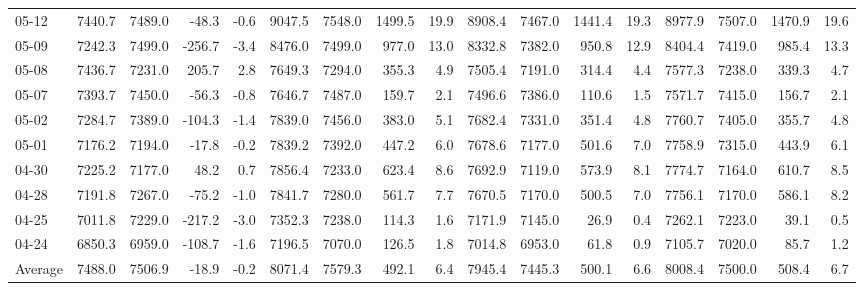 \begin{threeparttable}
{\begin{tabular}{lrrrrrrrrrrrrrrrr}
  05-12 & 7440.7 & 7489.0 &      -48.3 &           -0.6 &  9047.5 & 7548.0 &     1499.5 &           19.9 & 8908.4 & 7467.0 &     1441.4 &           19.3 & 8977.9 & 7507.0 &      1470.9 &             19.6 \\
  05-09 & 7242.3 & 7499.0 &     -256.7 &           -3.4 &  8476.0 & 7499.0 &      977.0 &           13.0 & 8332.8 & 7382.0 &      950.8 &           12.9 & 8404.4 & 7419.0 &       985.4 &             13.3 \\
  05-08 & 7436.7 & 7231.0 &      205.7 &            2.8 &  7649.3 & 7294.0 &      355.3 &            4.9 & 7505.4 & 7191.0 &      314.4 &            4.4 & 7577.3 & 7238.0 &       339.3 &              4.7 \\
  05-07 & 7393.7 & 7450.0 &      -56.3 &           -0.8 &  7646.7 & 7487.0 &      159.7 &            2.1 & 7496.6 & 7386.0 &      110.6 &            1.5 & 7571.7 & 7415.0 &       156.7 &              2.1 \\
  05-02 & 7284.7 & 7389.0 &     -104.3 &           -1.4 &  7839.0 & 7456.0 &      383.0 &            5.1 & 7682.4 & 7331.0 &      351.4 &            4.8 & 7760.7 & 7405.0 &       355.7 &              4.8 \\
  05-01 & 7176.2 & 7194.0 &      -17.8 &           -0.2 &  7839.2 & 7392.0 &      447.2 &            6.0 & 7678.6 & 7177.0 &      501.6 &            7.0 & 7758.9 & 7315.0 &       443.9 &              6.1 \\
  04-30 & 7225.2 & 7177.0 &       48.2 &            0.7 &  7856.4 & 7233.0 &      623.4 &            8.6 & 7692.9 & 7119.0 &      573.9 &            8.1 & 7774.7 & 7164.0 &       610.7 &              8.5 \\
  04-28 & 7191.8 & 7267.0 &      -75.2 &           -1.0 &  7841.7 & 7280.0 &      561.7 &            7.7 & 7670.5 & 7170.0 &      500.5 &            7.0 & 7756.1 & 7170.0 &       586.1 &              8.2 \\
  04-25 & 7011.8 & 7229.0 &     -217.2 &           -3.0 &  7352.3 & 7238.0 &      114.3 &            1.6 & 7171.9 & 7145.0 &       26.9 &            0.4 & 7262.1 & 7223.0 &        39.1 &              0.5 \\
  04-24 & 6850.3 & 6959.0 &     -108.7 &           -1.6 &  7196.5 & 7070.0 &      126.5 &            1.8 & 7014.8 & 6953.0 &       61.8 &            0.9 & 7105.7 & 7020.0 &        85.7 &              1.2 \\
Average & 7488.0 & 7506.9 &      -18.9 &           -0.2 &  8071.4 & 7579.3 &      492.1 &            6.4 & 7945.4 & 7445.3 &      500.1 &            6.6 & 8008.4 & 7500.0 &       508.4 &              6.7 \\

\end{tabular}}
\end{threeparttable}

